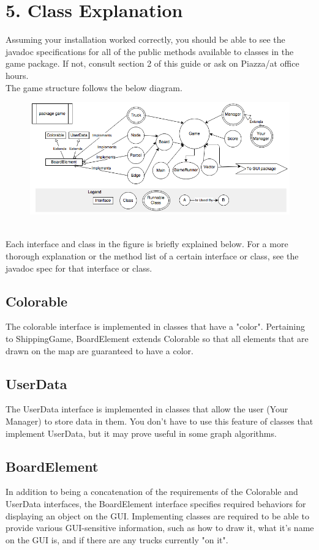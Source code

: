 \documentclass[11pt]{article}
\begin{document}
\newpage
\section{5. Class Explanation}
Assuming your installation worked correctly, you should be able to see the javadoc specifications for all of the public methods available to classes in the game package. If not, consult section 2 of this guide or ask on Piazza/at office hours.\\
The game structure follows the below diagram.
\begin{figure}[h]
\centerline{\includegraphics[scale=0.7]{hirearchy.png}} 
\end{figure}
\\Each interface and class in the figure is briefly explained below. For a more thorough  explanation or the method list of a certain interface or class, see the javadoc spec for that interface or class.
\subsection{Colorable}
The colorable interface is implemented in classes that have a "color". Pertaining to ShippingGame, BoardElement extends Colorable so that all elements that are drawn on the map are guaranteed to have a color.
\subsection{UserData}
The UserData interface is implemented in classes that allow the user (Your Manager) to store data in them. You don't have to use this feature of classes that implement UserData, but it may prove useful in some graph algorithms.
\subsection{BoardElement}
In addition to being a concatenation of the requirements of the Colorable and UserData interfaces, the BoardElement interface specifies required behaviors for displaying an object on the GUI. Implementing classes are required to be able to provide various GUI-sensitive information, such as how to draw it, what it's name on the GUI is, and if there are any trucks currently "on it".
\end{document}
